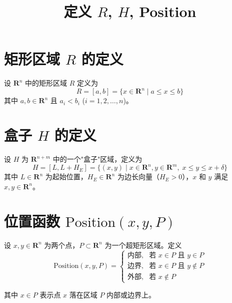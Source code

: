 \documentclass[12pt]{article}
\title{定义 $R$, $H$, Position}
\author{}
\date{}
\begin{document}
\maketitle

\section*{矩形区域 $R$ 的定义}

设 $\mathbf{R}^n$ 中的矩形区域 $R$ 定义为
\[
R = [a, b] = \{x \in \mathbf{R}^n \mid a \leq x \leq b\}
\]
其中 $a, b \in \mathbf{R}^n$ 且 $a_i < b_i$ ($i = 1, 2, \dots, n$)。

\section*{盒子 $H$ 的定义}

设 $H$ 为 $\mathbf{R}^{n+m}$ 中的一个"盒子"区域，定义为
\[
H = [L, L + H_E] = \{(x, y) \mid x \in \mathbf{R}^n, y \in \mathbf{R}^m, \; x \leq y \leq x + \delta\}
\]
其中 $L \in \mathbf{R}^n$ 为起始位置，$H_E \in \mathbf{R}^n$ 为边长向量（$H_E > 0$），$x$ 和 $y$ 满足 $x, y \in \mathbf{R}^n$。

\section*{位置函数 $\mathrm{Position}(x, y, P)$}

设 $x, y \in \mathbf{R}^n$ 为两个点，$P \subset \mathbf{R}^n$ 为一个超矩形区域。定义
\[
\mathrm{Position}(x, y, P) = \begin{cases}
\text{内部}, & \text{若 } x \in P \text{ 且 } y \in P \\[6pt]
\text{边界}, & \text{若 } x \in P \text{ 且 } y \notin P \\[6pt]
\text{外部}, & \text{若 } x \notin P
\end{cases}
\]

其中 $x \in P$ 表示点 $x$ 落在区域 $P$ 内部或边界上。
\end{document}
